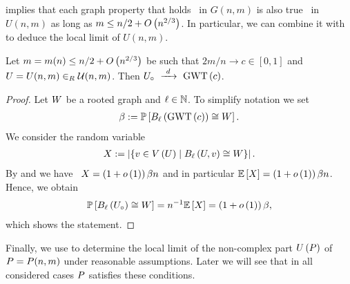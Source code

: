  implies that each graph property that holds \whp\ in $G(n,m)$ is also true \whp\ in $U(n,m)$ as long as $m\leq n/2+O\left(n^{2/3}\right)$. In particular, we can combine it with  to deduce the local limit of $U(n,m)$. 

\begin{coro}\label{LScoro:local_no_complex}
	Let $m=m(n)\leq n/2+O\left(n^{2/3}\right)$ be such that $2m/n\to c\in[0,1]$ and $U=U(n,m)\in_R\mathcal{U}(n,m)$. Then $U_\circ~\xrightarrow{~d~}~\operatorname{GWT}\left(c\right)$.
\end{coro}
\begin{proof}
Let $W$ be a rooted graph and $\ell\in\mathbb{N}$. To simplify notation we set 
\begin{align*}
\beta:=\mathbb{P}\left[B_{\ell}\left(\operatorname{GWT}\left(c\right)\right)\cong W\right].    
\end{align*}
We consider the random variable
\begin{align*}
X:=\left|\left\{v\in V\left(U\right) \mid B_{\ell}\left(U, v\right)\cong W\right\}\right|.
\end{align*}
By  and  we have \whp\ $X=\left(1+o\left(1\right)\right)\beta n$ and in particular $\mathbb{E}\left[X\right]=\left(1+o\left(1\right)\right)\beta n$. Hence, we obtain
\begin{align*}
\mathbb{P}\left[B_{\ell}\left(U_\circ\right)\cong W\right]=n^{-1}\mathbb{E}\left[X\right]=\left(1+o\left(1\right)\right)\beta,
\end{align*}
which shows the statement.
\end{proof}

Finally, we use  to determine the local limit of the non-complex part $U\left(P\right)$ of $P=P(n,m)$ under reasonable assumptions. Later we will see that in all considered cases $P$ satisfies these conditions.

